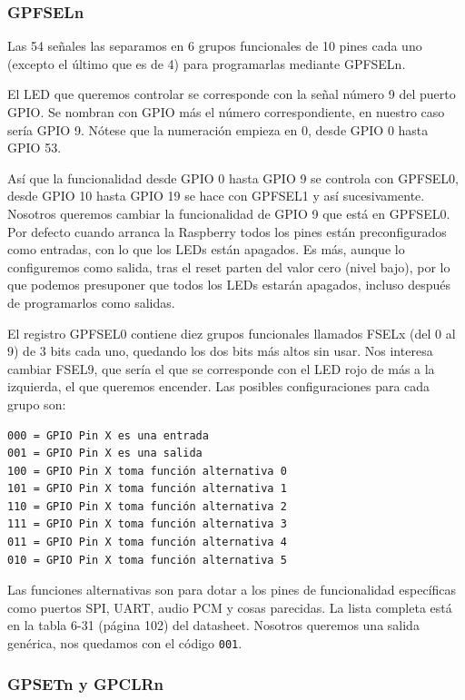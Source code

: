 \subsubsection{GPFSELn}

Las 54 señales las separamos en 6
grupos funcionales de 10 pines cada uno (excepto el último
que es de 4) para programarlas mediante GPFSELn.

El LED que queremos controlar se corresponde con la señal número 9 del puerto GPIO.
Se nombran con GPIO más el número correspondiente, en nuestro caso sería GPIO 9. Nótese
que la numeración empieza en 0, desde GPIO 0 hasta GPIO 53.

Así que la funcionalidad desde GPIO 0 hasta GPIO 9 se controla con
GPFSEL0, desde GPIO 10 hasta GPIO 19 se hace con GPFSEL1 y así
sucesivamente. Nosotros queremos cambiar la funcionalidad de GPIO 9
que está en GPFSEL0. Por defecto cuando arranca la Raspberry
todos los pines están preconfigurados como entradas, con lo que los LEDs
están apagados. Es más, aunque lo configuremos como salida, tras el reset
parten del valor cero (nivel bajo), por lo que podemos presuponer que
todos los LEDs estarán apagados, incluso después de programarlos como salidas.

El registro GPFSEL0 contiene diez grupos funcionales
llamados FSELx (del 0 al 9) de 3 bits cada uno, quedando los dos bits
más altos sin usar. Nos interesa cambiar FSEL9, que sería el que se corresponde
con el LED rojo de más a la izquierda, el que queremos encender. Las posibles
configuraciones para cada grupo son:

\begin{lstlisting}
000 = GPIO Pin X es una entrada
001 = GPIO Pin X es una salida
100 = GPIO Pin X toma función alternativa 0
101 = GPIO Pin X toma función alternativa 1
110 = GPIO Pin X toma función alternativa 2
111 = GPIO Pin X toma función alternativa 3
011 = GPIO Pin X toma función alternativa 4
010 = GPIO Pin X toma función alternativa 5
\end{lstlisting}

Las funciones alternativas son para dotar a los pines de funcionalidad específicas
como puertos SPI, UART, audio PCM y cosas parecidas. La lista completa
está en la tabla 6-31 (página 102) del datasheet. Nosotros queremos una salida
genérica, nos quedamos con el código {\tt 001}.


\subsubsection{GPSETn y GPCLRn}

